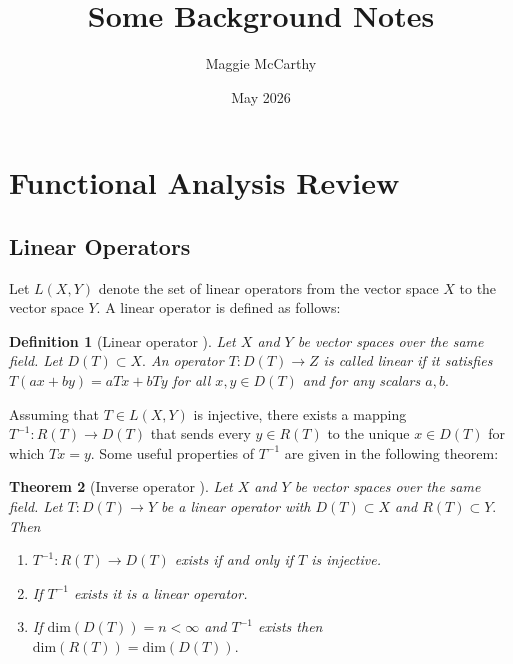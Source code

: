 \documentclass[12pt,a4paper]{article}
\title{Some Background Notes}
\author{Maggie McCarthy}
\date{May 2026}
\theoremstyle{boldthm}
\newtheorem{theorem}{Theorem}[section]
\theoremstyle{bolddefn}
\newtheorem{definition}[theorem]{Definition}
\begin{document}
\maketitle



\section{Functional Analysis Review}


\subsection{Linear Operators}

Let $L(X, Y)$ denote the set of linear operators from the vector space $X$ to the vector space $Y.$ A linear operator is defined as follows:
\begin{definition}[{Linear operator \cite[2.6-1]{krey}}]
    Let $X$ and $Y$ be vector spaces over the same field. Let $D(T) \subset X.$
   An operator $T : D(T) \rightarrow Z$ is called linear if it satisfies  $T(ax+by) = aTx + bTy$ for all $x, y \in D(T)$ and for any scalars $a, b.$ 
\end{definition}

Assuming that $T \in L(X, Y)$ is injective, there exists a mapping $T^{-1}: R(T) \rightarrow D(T)$ that sends every $y \in R(T)$ to the unique $x \in D(T)$ for which $Tx = y.$ Some useful properties of $T^{-1}$ are given in the following theorem:

\begin{theorem}[{Inverse operator \cite[2.6-10]{krey}}] \label{inv}
Let $X$ and $Y$ be vector spaces over the same field. Let $T : D(T) \rightarrow Y$ be a linear operator with $D(T) \subset X$ and $R(T) \subset Y.$ Then 
\begin{enumerate}
    \item $T^{-1} : R(T) \rightarrow D(T)$ exists if and only if $T$ is injective.
    \item If $T^{-1}$ exists it is a linear operator.
    \item If $\text{dim}(D(T)) = n < \infty$ and $T^{-1}$ exists then $\text{dim}(R(T)) = \text{dim}(D(T)).$
\end{enumerate}
    
\end{theorem}
\end{document}
